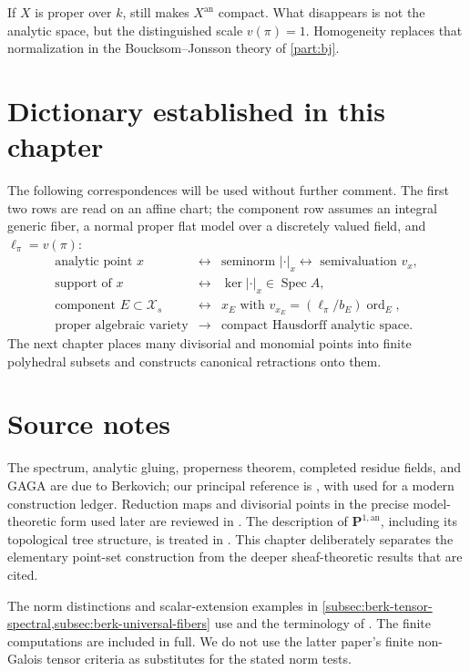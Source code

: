 If $X$ is proper over $k$,  still
makes $X^{\mathrm{an}}$ compact. What disappears is not the analytic
space, but the distinguished scale $v(\pi)=1$. Homogeneity replaces that
normalization in the Boucksom--Jonsson theory of \cref{part:bj}.

\section{Dictionary established in this chapter}

The following correspondences will be used without further comment.
The first two rows are read on an affine chart; the component row assumes
an integral generic fiber, a normal proper flat model over a discretely
valued field, and $\ell_\pi=v(\pi)$:
\[
\begin{array}{ccl}
\text{analytic point }x
 &\longleftrightarrow&
 \text{seminorm }|\cdot|_x
 \longleftrightarrow \text{ semivaluation }v_x,\\[1mm]
\text{support of }x
 &\longleftrightarrow&
 \ker|\cdot|_x\in\operatorname{Spec}A,\\[1mm]
\text{component }E\subset\mathcal X_s
 &\longleftrightarrow&
 x_E\text{ with }v_{x_E}=(\ell_\pi/b_E)\operatorname{ord}_E,\\[1mm]
\text{proper algebraic variety}
 &\longrightarrow&
 \text{compact Hausdorff analytic space}.
\end{array}
\]
The next chapter places many divisorial and monomial points into finite
polyhedral subsets and constructs canonical retractions onto them.

\section*{Source notes}

The spectrum, analytic gluing, properness theorem, completed residue fields,
and GAGA are due to Berkovich; our principal reference is \cite{Berk12},
with \cite{Temkin2015Berkovich} used for a modern construction ledger.
Reduction maps and divisorial points in the precise model-theoretic form used
later are reviewed in \cite[Sections~2--3]{BFJ16}. The description of
$\mathbf P^{1,\mathrm{an}}$, including its topological tree structure, is treated
in \cite[Chapter~2]{BakerRumely2010}. This chapter deliberately separates the elementary
point-set construction from the deeper sheaf-theoretic results that are
cited.

The norm distinctions and scalar-extension examples in
\cref{subsec:berk-tensor-spectral,subsec:berk-universal-fibers}
use \cite[\S3]{Poi13Angelic} and the terminology of
\cite[\S\S1.1--1.2]{TZ26GeometricNorms}. The finite computations
are included in full. We do not use the latter paper's finite
non-Galois tensor criteria as substitutes for the stated norm tests.
